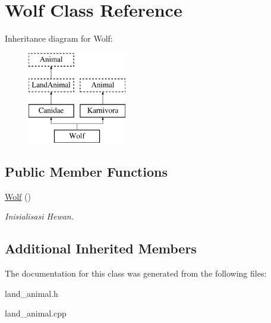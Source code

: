 \hypertarget{class_wolf}{}\section{Wolf Class Reference}
\label{class_wolf}
Inheritance diagram for Wolf\+:\begin{figure}[H]
\begin{center}
\leavevmode
\includegraphics[height=4.000000cm]{class_wolf}
\end{center}
\end{figure}
\subsection*{Public Member Functions}
\begin{DoxyCompactItemize}
\item 
\hyperlink{class_wolf_aade632d2ff587e52f6dbe07ccc2f73f4}{Wolf} ()\hypertarget{class_wolf_aade632d2ff587e52f6dbe07ccc2f73f4}{}\label{class_wolf_aade632d2ff587e52f6dbe07ccc2f73f4}

\begin{DoxyCompactList}\small\item\em Inisialisasi Hewan. \end{DoxyCompactList}\end{DoxyCompactItemize}
\subsection*{Additional Inherited Members}


The documentation for this class was generated from the following files\+:\begin{DoxyCompactItemize}
\item 
land\+\_\+animal.\+h\item 
land\+\_\+animal.\+cpp\end{DoxyCompactItemize}
